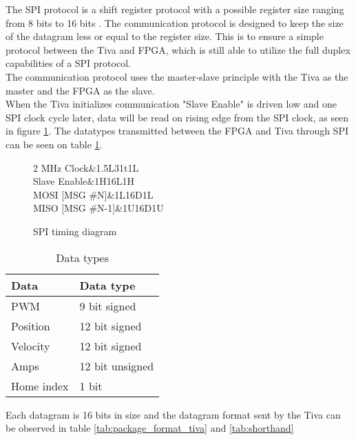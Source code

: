 \documentclass[../../../main]{subfiles}
\begin{document}
The SPI protocol is a shift register protocol with a possible register size ranging from 8 bits to 16 bits \cite[sec.15]{tiva_data}.
The communication protocol is designed to keep the size of the datagram less or equal to the register size. This is to ensure a simple protocol between the Tiva and FPGA, which is still able to utilize the full duplex capabilities of a SPI protocol. \\
The communication protocol uses the master-slave principle with the Tiva as the master and the FPGA as the slave.\\
When the Tiva initializes communication "Slave Enable" is driven low and one SPI clock cycle later,
data will be read on rising edge from the SPI clock, as seen in figure \ref{fig:spi_timing_diagram}. The datatypes transmitted between the FPGA and Tiva through SPI can be seen on table \ref{tab:spi_datatypes}.
\\

\begin{figure}[h]
	\center
\begin{tikztimingtable}[timing/font=\normalfont]
	{2 MHz Clock}&1.5L31{t}1L\\
	{Slave Enable}&1H16L1H\\
	{MOSI [MSG \#N]}&1L16{D{}}1L\\
	{MISO [MSG \#N-1]}&1U16{D{}}1U\\
\end{tikztimingtable}
\caption{SPI timing diagram}
\label{fig:spi_timing_diagram}
\end{figure}

\begin{table}[h]
	\centering
	\begin{tabular}{ll}
		\textbf{Data}& \textbf{Data type}  \\
		\hline
		PWM& 9 bit signed \\
		Position& 12 bit signed \\
		Velocity& 12 bit signed \\
		Amps& 12 bit unsigned \\
		Home index& 1 bit
	\end{tabular}
	\caption{Data types}
	\label{tab:spi_datatypes}
\end{table}

Each datagram is 16 bits in size and the datagram format sent by the Tiva
can be observed in table \ref{tab:package_format_tiva} and \ref{tab:shorthand}
\end{document}
